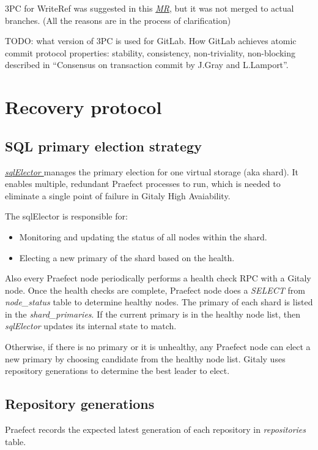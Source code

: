 \documentclass[acmlarge, screen, nonacm]{acmart}
\begin{document}
3PC for WriteRef was suggested in this
\emph{\href{https://gitlab.com/gitlab-org/gitaly/-/issues/2466}{MR}},
but it was not merged to actual branches. (All the reasons are in the process of clarification)

TODO: what version of 3PC is used for GitLab. How GitLab achieves atomic commit protocol properties:
stability, consistency, non-triviality, non-blocking described in
``Consensus on transaction commit by J.Gray and L.Lamport''.

\section{Recovery protocol}

\subsection{SQL primary election strategy}
\emph{\href{https://gitlab.com/gitlab-org/gitaly/-/blob/master/internal/praefect/nodes/sql_elector.go}{sqlElector }}manages the primary election for one virtual storage (aka
shard). It enables multiple, redundant Praefect processes to run,
which is needed to eliminate a single point of failure in Gitaly High
Avaiability.

The sqlElector is responsible for:
\begin{itemize}
\item Monitoring and updating the status of all nodes within the shard.
\item Electing a new primary of the shard based on the health.
\end{itemize}
Also every Praefect node periodically performs a health check RPC with a Gitaly node.  Once the health checks are complete, 
Praefect node does a \textit{SELECT} from \textit{node\_status} table to determine healthy nodes.
The primary of each shard is listed in the
\textit{shard\_primaries}. If the current primary is in the healthy
node list, then \textit{sqlElector} updates its internal state to match.

Otherwise, if there is no primary or it is unhealthy, any Praefect node
can elect a new primary by choosing candidate from the healthy node
list. Gitaly uses repository generations to determine the best leader to elect.  
\subsection{Repository generations }

Praefect records the expected latest generation of each repository  in \textit{repositories } table.
\end{document}

